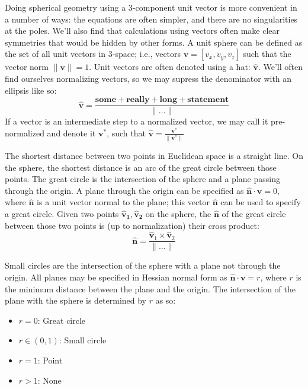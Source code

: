 \documentclass{amsart}[12pt]
\begin{document}
Doing spherical geometry using a 3-component unit vector is more convenient
in a number of ways: the equations are often simpler, and there are no
singularities at the poles. We'll also find that calculations using vectors
often make clear symmetries that would be hidden by other forms. A unit sphere
can be defined as the set of all unit
vectors in 3-space; i.e., vectors $\mathbf v = [v_x, v_y, v_z]$ such that the
vector norm $\|\mathbf v \|=1$. Unit vectors are often denoted using a hat:
$\hat{\mathbf v}$. We'll often find ourselves normalizing vectors,
so we may supress the denominator with an ellipsis like so:
\begin{equation}
  \hat{\mathbf v} = \frac{\mathbf{some+really+long+statement}}{\|\dots\|}
\end{equation}
If a vector is an intermediate step to a normalized vector,
we may call it pre-normalized and denote it ${\mathbf v}^*$,
such that $\hat{\mathbf v} = \frac{{\mathbf v}^*}{ \|{\mathbf v}^*\|}$

The shortest distance between two points in Euclidean space is a straight line.
On the sphere, the shortest distance is an arc of the great circle between those
points. The great circle is the intersection of the sphere and a plane passing
through the origin. A plane through the origin can be specified as
$\hat{\mathbf n} \cdot \mathbf v = 0$, where $\hat{\mathbf n}$ is a unit vector
normal to the plane; this vector $\hat{\mathbf n}$ can be used to specify a
great circle. Given two points $\mathbf{\hat{v}_1, \hat{v}_2}$ on the sphere,
the $\hat{\mathbf n}$ of the great circle between those two points is (up to
normalization) their cross product:
\begin{equation}
  \mathbf{\hat{n}} =
\frac{\mathbf{\hat{v}}_1 \times \mathbf{\hat{v}}_2}{\|\dots\|}
\end{equation}

Small circles are the intersection of the sphere with a plane not through
the origin. All planes may be specified in Hessian normal form as
$\mathbf{\hat{n}} \cdot \mathbf v = r$, where $r$ is the minimum distance
between the plane and the origin. The intersection of the plane with the sphere
is determined by $r$ as so:

\begin{itemize}
  \item $r = 0$: Great circle
  \item $r \in (0,1)$: Small circle
  \item $r = 1$: Point
  \item $r > 1$: None
\end{itemize}
\end{document}
